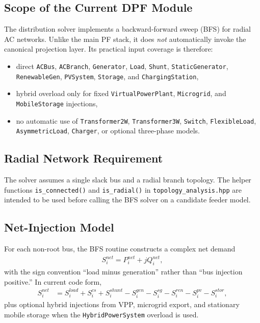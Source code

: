 \subsection{Scope of the Current DPF Module}

The distribution solver implements a backward-forward sweep (BFS) for radial AC
networks.  Unlike the main PF stack, it does \emph{not} automatically invoke the
canonical projection layer.  Its practical input coverage is therefore:
\begin{itemize}
  \item direct \texttt{ACBus}, \texttt{ACBranch}, \texttt{Generator}, \texttt{Load}, \texttt{Shunt}, \texttt{StaticGenerator}, \texttt{RenewableGen}, \texttt{PVSystem}, \texttt{Storage}, and \texttt{ChargingStation},
  \item hybrid overload only for fixed \texttt{VirtualPowerPlant}, \texttt{Microgrid}, and \texttt{MobileStorage} injections,
  \item no automatic use of \texttt{Transformer2W}, \texttt{Transformer3W}, \texttt{Switch}, \texttt{FlexibleLoad}, \texttt{AsymmetricLoad}, \texttt{Charger}, or optional three-phase models.
\end{itemize}

\subsection{Radial Network Requirement}

The solver assumes a single slack bus and a radial branch topology.  The helper
functions \texttt{is\_connected()} and \texttt{is\_radial()} in
\texttt{topology\_analysis.hpp} are intended to be used before calling the BFS
solver on a candidate feeder model.

\subsection{Net-Injection Model}

For each non-root bus, the BFS routine constructs a complex net demand
\begin{align}
S_i^{net} = P_i^{net} + jQ_i^{net},
\end{align}
with the sign convention ``load minus generation'' rather than ``bus injection
positive.''  In current code form,
\begin{align}
S_i^{net} &= S_i^{load} + S_i^{cs} + S_i^{shunt} - S_i^{gen} - S_i^{sg} - S_i^{ren} - S_i^{pv} - S_i^{stor},
\end{align}
plus optional hybrid injections from VPP, microgrid export, and stationary
mobile storage when the \texttt{HybridPowerSystem} overload is used.

